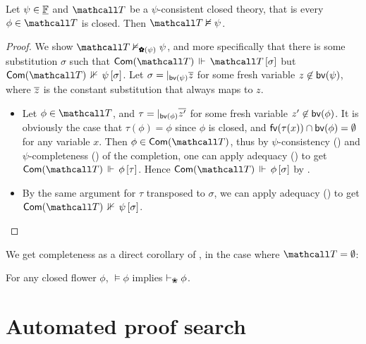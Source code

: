 \begin{lemma}
  
  Let $\psi \in \underline{\mathbb{F}}$ and $\tT$ be a $\psi$-consistent closed theory,
  that is every $\phi \in \tT$ is closed. Then $\tT \nvDash \psi$.
\end{lemma}
\begin{proof}
  We show $\tT \nvDash_{\rewolF{\psi}} \psi$, and more specifically that there
  is some substitution $\sigma$ such that
  $\eforces{\completion{\tT}}{\tT}{\sigma}$ but
  $\neforces{\completion{\tT}}{\psi}{\sigma}$. Let $\sigma =
  \mathbin{|_{\mathsf{bv}(\psi)}} \overline{z}$ for some fresh variable $z \not\in
  \mathsf{bv}(\psi)$, where $\overline{z}$ is the constant substitution that always maps
  to $z$.
  \begin{itemize}
    \item Let $\phi \in \tT$, and $\tau = \mathbin{|_{\mathsf{bv}(\phi)}} \overline{z'}$ for
    some fresh variable $z' \not\in \mathsf{bv}(\phi)$. It is obviously the case that
    $\tau(\phi) = \phi$ since $\phi$ is closed, and $\mathsf{fv}(\tau(x)) \cap \mathsf{bv}(\phi)
    = \emptyset$ for any variable $x$. Then $\phi \in \completion{\tT}$, thus by
    $\psi$-consistency () and
    $\psi$-completeness () of the completion, one
    can apply adequacy () to get
    $\eforces{\completion{\tT}}{\phi}{\tau}$. Hence
    $\eforces{\completion{\tT}}{\phi}{\sigma}$ by .
    \item By the same argument for $\tau$ transposed to $\sigma$, we can apply
    adequacy () to get
    $\neforces{\completion{\tT}}{\psi}{\sigma}$.
  \end{itemize}
\end{proof}

We get completeness as a direct corollary of , in
the case where $\tT = \emptyset$:

\begin{theorem}[Completeness]
  For any closed flower $\phi$, $\vDash \phi$ implies $\vdash_\Nature \phi$.
\end{theorem}


\section{Automated proof search}



